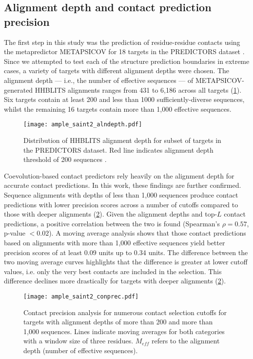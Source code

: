\subsection{Alignment depth and contact prediction precision}
The first step in this study was the prediction of residue-residue contacts using the metapredictor METAPSICOV for 18 targets in the PREDICTORS dataset \cite{Jones2015-vq}. Since we attempted to test each of the structure prediction boundaries in extreme cases, a variety of targets with different alignment depths were chosen. The alignment depth --- i.e., the number of effective sequences --- of METAPSICOV-generated HHBLITS alignments ranges from 431 to 6,186 across all targets (\cref{fig:ample_saint2_alndepth}). Six targets contain at least 200 and less than 1000 sufficiently-diverse sequences, whilst the remaining 16 targets contain more than 1,000 effective sequences.

\begin{figure}[H]
    \centering
    \texttt{[image: ample\_saint2\_alndepth.pdf]}
    \caption[Distribution of alignment depth for subset of targets in the PREDICTORS dataset.]{Distribution of HHBLITS alignment depth for subset of targets in the PREDICTORS dataset. Red line indicates alignment depth threshold of 200 sequences \cite{Simkovic2017-xs}.}
    \label{fig:ample_saint2_alndepth}
\end{figure}

Coevolution-based contact predictors rely heavily on the alignment depth for accurate contact predictions. In this work, these findings are further confirmed. Sequence alignments with depths of less than 1,000 sequences produce contact predictions with lower precision scores across a number of cutoffs compared to those with deeper alignments (\cref{fig:ample_saint2_conprec}). Given the alignment depths and top-$L$ contact predictions, a positive correlation between the two is found (Spearman's $\rho=0.57$, p-value $<0.02$). A moving average analysis shows that those contact predictions based on alignments with more than 1,000 effective sequences yield better precision scores of at least 0.09 units up to 0.34 units. The difference between the two moving average curves highlights that the difference is greater at lower cutoff values, i.e. only the very best contacts are included in the selection. This difference declines more drastically for targets with deeper alignments (\cref{fig:ample_saint2_conprec}).

\begin{figure}[H]
    \centering
    \texttt{[image: ample\_saint2\_conprec.pdf]}
    \caption[Contact predicion analysis for numerous contact selection cutoffs]{Contact precision analysis for numerous contact selection cutoffs for targets with alignment depths of more than 200 and more than 1,000 sequences. Lines indicate moving averages for both categories with a window size of three residues. $M_{eff}$ refers to the alignment depth (number of effective sequences).}
    \label{fig:ample_saint2_conprec}
\end{figure}

